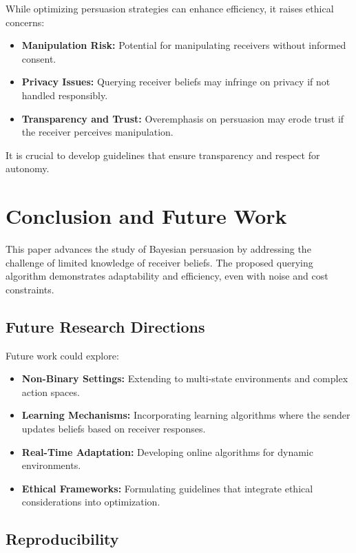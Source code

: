 \documentclass[12pt]{article}
\begin{document}
While optimizing persuasion strategies can enhance efficiency, it raises ethical concerns:

\begin{itemize}
    \item \textbf{Manipulation Risk:} Potential for manipulating receivers without informed consent.
    \item \textbf{Privacy Issues:} Querying receiver beliefs may infringe on privacy if not handled responsibly.
    \item \textbf{Transparency and Trust:} Overemphasis on persuasion may erode trust if the receiver perceives manipulation.
\end{itemize}

It is crucial to develop guidelines that ensure transparency and respect for autonomy.

\section{Conclusion and Future Work}

This paper advances the study of Bayesian persuasion by addressing the challenge of limited knowledge of receiver beliefs. The proposed querying algorithm demonstrates adaptability and efficiency, even with noise and cost constraints.

\subsection{Future Research Directions}

Future work could explore:

\begin{itemize}
    \item \textbf{Non-Binary Settings:} Extending to multi-state environments and complex action spaces.
    \item \textbf{Learning Mechanisms:} Incorporating learning algorithms where the sender updates beliefs based on receiver responses.
    \item \textbf{Real-Time Adaptation:} Developing online algorithms for dynamic environments.
    \item \textbf{Ethical Frameworks:} Formulating guidelines that integrate ethical considerations into optimization.
\end{itemize}

\subsection{Reproducibility}
\end{document}
